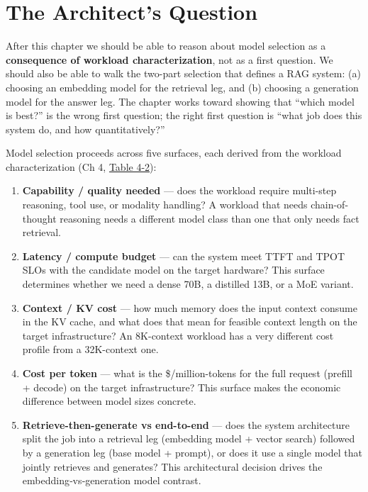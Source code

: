 \section*{The Architect's Question}\label{the-architects-question}

After this chapter we should be able to reason about model selection as
a \textbf{consequence of workload characterization}, not as a first
question. We should also be able to walk the two-part selection that
defines a RAG system: (a) choosing an embedding model for the retrieval
leg, and (b) choosing a generation model for the answer leg. The chapter
works toward showing that ``which model is best?'' is the wrong first
question; the right first question is ``what job does this system do,
and how quantitatively?''

\label{concept}


Model selection proceeds across five surfaces, each derived from the
workload characterization (Ch 4, \hyperref[tab:4.2]{Table 4-2}):

\begin{enumerate}
\def\labelenumi{\arabic{enumi}.}
\tightlist
\item
  \textbf{Capability / quality needed} --- does the workload require
  multi-step reasoning, tool use, or modality handling? A workload that
  needs chain-of-thought reasoning needs a different model class than
  one that only needs fact retrieval.
\item
  \textbf{Latency / compute budget} --- can the system meet TTFT and
  TPOT SLOs with the candidate model on the target hardware? This
  surface determines whether we need a dense 70B, a distilled 13B, or a
  MoE variant.
\item
  \textbf{Context / KV cost} --- how much memory does the input context
  consume in the KV cache, and what does that mean for feasible context
  length on the target infrastructure? An 8K-context workload has a very
  different cost profile from a 32K-context one.
\item
  \textbf{Cost per token} --- what is the \$/million-tokens for the full
  request (prefill + decode) on the target infrastructure? This surface
  makes the economic difference between model sizes concrete.
\item
  \textbf{Retrieve-then-generate vs end-to-end} --- does the system
  architecture split the job into a retrieval leg (embedding model +
  vector search) followed by a generation leg (base model + prompt), or
  does it use a single model that jointly retrieves and generates? This
  architectural decision drives the embedding‑vs‑generation model
  contrast.
\end{enumerate}

